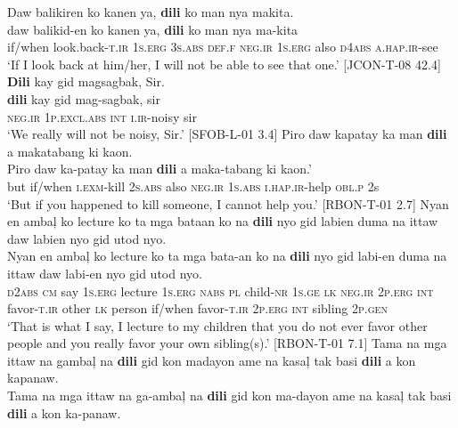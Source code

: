 \ea
\label{bkm:Ref373243062}
Daw  balikiren  ko  kanen  ya,  \textbf{dili}  ko  man  nya makita. \\\smallskip
\gll daw  balikid-en  ko  kanen  ya,  \textbf{dili}  ko  man  nya ma-kita \\
if/when  look.back-\textsc{t.ir}  1\textsc{s.erg}  3\textsc{s.abs}  \textsc{def.f}  \textsc{neg.ir}  1\textsc{s.erg}  also  \textsc{d}4\textsc{abs} \textsc{a.hap.ir}-see \\
\glt ‘If I look back at him/her, I will not be able to see that one.’ [JCON-T-08 42.4]
\z
\ea
\textbf{Dili}  kay  gid  magsagbak,  Sir. \\\smallskip
\gll \textbf{dili}  kay  gid  mag-sagbak,  sir \\
\textsc{neg.ir}  1\textsc{p.excl.abs}  \textsc{int}  \textsc{i.ir}-noisy  sir \\
\glt ‘We really will not be noisy, Sir.’ [SFOB-L-01 3.4]
\z
\ea
Piro  daw  kapatay  ka  man  \textbf{dili}  a  makatabang  ki  kaon. \\\smallskip
\gll Piro  daw  ka-patay  ka  man  \textbf{dili}  a  maka-tabang  ki  kaon.' \\
but  if/when  \textsc{i.exm}-kill  2\textsc{s.abs}  also  \textsc{neg.ir}  1\textsc{s.abs}  \textsc{i.hap.ir}-help  \textsc{obl.p}  2s \\
\glt ‘But if you happened to kill someone, I cannot help you.’ [RBON-T-01 2.7]
\z
\ea
Nyan  en  ambaļ  ko  lecture  ko  ta  mga  bataan  ko na  \textbf{dili}  nyo  gid  labien  duma  na  ittaw  daw  labien nyo  gid  utod  nyo. \\\smallskip
\gll Nyan  en  ambaļ  ko  lecture  ko  ta  mga  bata-an  ko na  \textbf{dili}  nyo  gid  labi-en  duma  na  ittaw  daw  labi-en nyo  gid  utod  nyo. \\
\textsc{d}2\textsc{abs}  \textsc{cm}  say  1\textsc{s.erg}  lecture  1\textsc{s.erg}  \textsc{nabs}  \textsc{pl}  child-\textsc{nr}  1\textsc{s.ge} \textsc{lk}  \textsc{neg.ir}  2\textsc{p.erg}  \textsc{int}  favor-\textsc{t.ir}  other  \textsc{lk}  person  if/when  favor-\textsc{t.ir} 2\textsc{p.erg}  \textsc{int}  sibling  2\textsc{p.gen} \\
\glt `That is what I say, I lecture to my children that you do not ever favor other people and you really favor your own sibling(s).’ [RBON-T-01 7.1]
\z
\ea
Tama  na  mga  ittaw  na  gambaļ  na  \textbf{dili}  gid  kon  madayon ame  na  kasaļ  tak  basi  \textbf{dili}  a  kon  kapanaw. \\\smallskip
\gll Tama  na  mga  ittaw  na  ga-ambaļ  na  \textbf{dili}  gid  kon  ma-dayon ame  na  kasaļ  tak  basi  \textbf{dili}  a  kon  ka-panaw. \\
